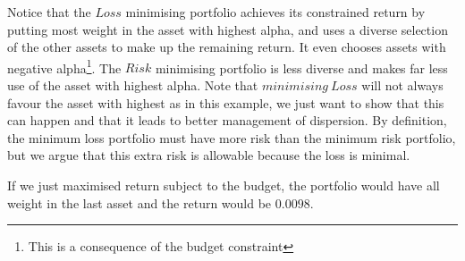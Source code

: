 \documentclass[12pt]{article}
\begin{document}
\break
Notice that the $Loss$ minimising portfolio achieves its constrained return by putting most weight in the
asset with highest alpha, and uses a diverse selection of the other assets to make up the remaining 
return. It even chooses assets with negative alpha\footnote{This is a consequence of the budget constraint}. The $Risk$ minimising portfolio is less diverse and makes far less use of the asset with highest alpha.
Note that $minimising\ Loss$ will not always favour the asset with highest as in this example, we just want 
to show that this can happen and that it leads to better management of dispersion. By definition, the minimum loss 
portfolio must have more risk than the minimum risk portfolio, but we argue that this extra risk is allowable 
because the loss is minimal.

If we just maximised return subject to the budget, the portfolio would have all weight in the last 
asset and the return would be $0.0098$.
\end{document}
